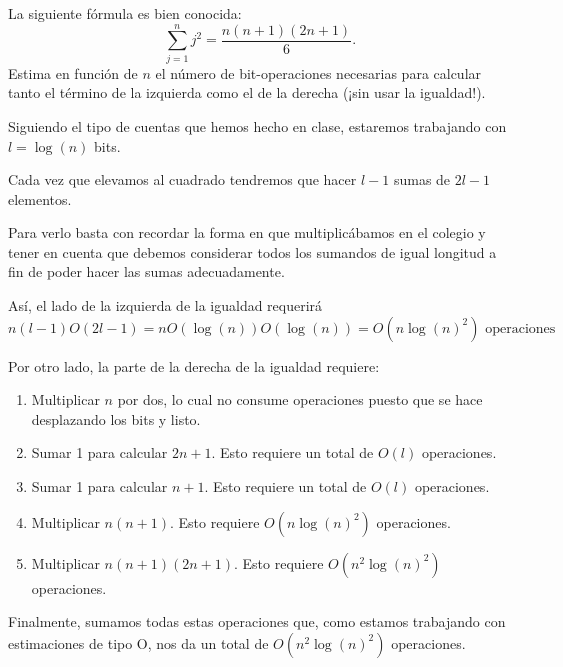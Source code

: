\begin{problem}[9]
La siguiente fórmula es bien conocida:
$$\sum_{j=1}^n j^2=\frac{n(n+1)(2n+1)}{6}.$$
Estima en función de $n$ el número de bit-operaciones necesarias para
calcular tanto el término de la izquierda como el de la derecha (¡sin usar la igualdad!).
\solution


Siguiendo el tipo de cuentas que hemos hecho en clase, estaremos trabajando con $l=\log(n)$ bits.

Cada vez que elevamos al cuadrado tendremos que hacer $l-1$ sumas de $2l-1$ elementos.

\obs Para verlo basta con recordar la forma en que multiplicábamos en el colegio y tener en cuenta que debemos considerar todos los sumandos de igual longitud a fin de poder hacer las sumas adecuadamente.

Así, el lado de la izquierda de la igualdad requerirá 
\[n(l-1)O(2l-1)=nO(\log(n))O(\log(n))=O(n\log(n)^2) \text{ operaciones}\]

Por otro lado, la parte de la derecha de la igualdad requiere:
\begin{enumerate}
\item Multiplicar $n$ por dos, lo cual no consume operaciones puesto que se hace desplazando los bits y listo.
\item Sumar 1 para calcular $2n+1$. Esto requiere un total de $O(l)$ operaciones.
\item Sumar 1 para calcular $n+1$. Esto requiere un total de $O(l)$ operaciones.
\item Multiplicar $n(n+1)$. Esto requiere $O(n\log(n)^2)$ operaciones.
\item Multiplicar $n(n+1)(2n+1)$. Esto requiere $O(n^2\log(n)^2)$ operaciones.
\end{enumerate}

Finalmente, sumamos todas estas operaciones que, como estamos trabajando con estimaciones de tipo O, nos da un total de $O(n^2\log(n)^2)$ operaciones.

\end{problem}

